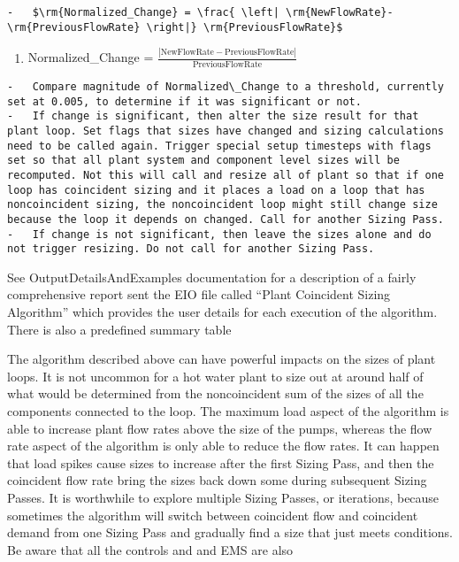 \begin{lstlisting}
-   $\rm{Normalized_Change} = \frac{ \left| \rm{NewFlowRate}-\rm{PreviousFlowRate} \right|} \rm{PreviousFlowRate}$
\end{lstlisting}

\begin{enumerate}
\def\labelenumi{\arabic{enumi}.}
\setcounter{enumi}{6}
\tightlist
\item
  Normalized\_Change = \(\frac{\left|\text{NewFlowRate}-\text{PreviousFlowRate}\right|}{\text{PreviousFlowRate}}\)
\end{enumerate}

\begin{lstlisting}
-   Compare magnitude of Normalized\_Change to a threshold, currently set at 0.005, to determine if it was significant or not.
-   If change is significant, then alter the size result for that plant loop. Set flags that sizes have changed and sizing calculations need to be called again. Trigger special setup timesteps with flags set so that all plant system and component level sizes will be recomputed. Not this will call and resize all of plant so that if one loop has coincident sizing and it places a load on a loop that has noncoincident sizing, the noncoincident loop might still change size because the loop it depends on changed. Call for another Sizing Pass.
-   If change is not significant, then leave the sizes alone and do not trigger resizing. Do not call for another Sizing Pass.
\end{lstlisting}

See OutputDetailsAndExamples documentation for a description of a fairly comprehensive report sent the EIO file called ``Plant Coincident Sizing Algorithm'' which provides the user details for each execution of the algorithm. There is also a predefined summary table

The algorithm described above can have powerful impacts on the sizes of plant loops. It is not uncommon for a hot water plant to size out at around half of what would be determined from the noncoincident sum of the sizes of all the components connected to the loop. The maximum load aspect of the algorithm is able to increase plant flow rates above the size of the pumps, whereas the flow rate aspect of the algorithm is only able to reduce the flow rates. It can happen that load spikes cause sizes to increase after the first Sizing Pass, and then the coincident flow rate bring the sizes back down some during subsequent Sizing Passes. It is worthwhile to explore multiple Sizing Passes, or iterations, because sometimes the algorithm will switch between coincident flow and coincident demand from one Sizing Pass and gradually find a size that just meets conditions. Be aware that all the controls and and EMS are also
